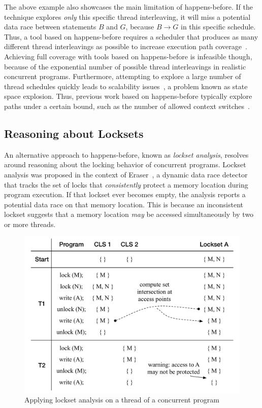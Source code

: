The above example also showcases the main limitation of happens-before. If the technique explores \emph{only} this specific thread interleaving, it will miss a potential data race between statements $B$ and $G$, because $B \rightarrow G$ in this specific schedule. Thus, a tool based on happens-before requires a scheduler that produces as many different thread interleavings as possible to increase execution path coverage~\cite{savage1997eraser}. Achieving full coverage with tools based on happens-before is infeasible though, because of the exponential number of possible thread interleavings in realistic concurrent programs. Furthermore, attempting to explore a large number of thread schedules quickly leads to scalability issues~\cite{musuvathi2008finding}, a problem known as state space explosion. Thus, previous work based on happens-before typically explore paths under a certain bound, such as the number of allowed context switches~\cite{qadeer2004kiss}.

\subsection{Reasoning about Locksets}
\label{bg:lockset}

An alternative approach to happens-before, known as \emph{lockset analysis}, resolves around reasoning about the locking behavior of concurrent programs. Lockset analysis was proposed in the context of Eraser~\cite{savage1997eraser}, a dynamic data race detector that tracks the set of locks that \emph{consistently} protect a memory location during program execution. If that lockset ever becomes empty, the analysis reports a potential data race on that memory location.  This is because an inconsistent lockset suggests that a memory location \emph{may} be accessed simultaneously by two or more threads.

\begin{figure}[htbp]
\centering
\includegraphics[width=1\linewidth]{img/lockset.pdf}
\caption{Applying lockset analysis on a thread of a concurrent program}
\label{fig:locksets}
\end{figure}

